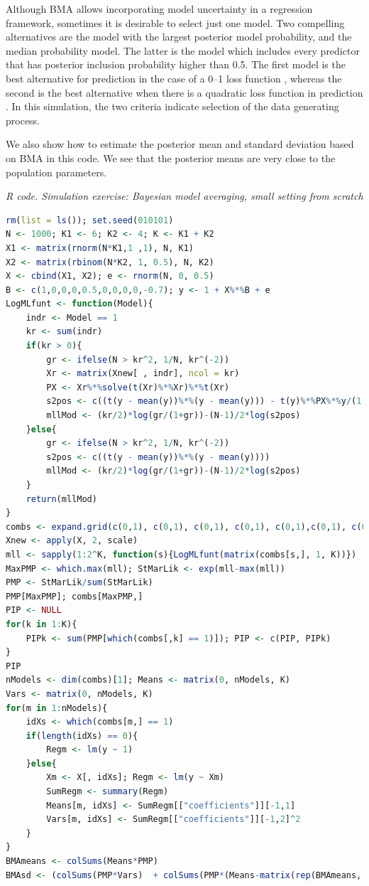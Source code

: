 Although BMA allows incorporating model uncertainty in a regression framework, sometimes it is desirable to select just one model. Two compelling alternatives are the model with the largest posterior model probability, and the median probability model. The latter is the model which includes every predictor that has posterior inclusion probability higher than 0.5. The first model is the best alternative for prediction in the case of a 0--1 loss function \cite{Clyde2004}, whereas the second is the best alternative when there is a quadratic loss function in prediction \cite{Barbieri2004}. In this simulation, the two criteria indicate selection of the data generating process.

We also show how to estimate the posterior mean and standard deviation based on BMA in this code. We see that the posterior means are very close to the population parameters.  

\begin{tcolorbox}[enhanced,width=4.67in,center upper,
	fontupper=\large\bfseries,drop shadow southwest,sharp corners]
	\textit{R code. Simulation exercise: Bayesian model averaging, small setting from scratch}
	\begin{VF}
		\begin{lstlisting}[language=R]
rm(list = ls()); set.seed(010101)
N <- 1000; K1 <- 6; K2 <- 4; K <- K1 + K2
X1 <- matrix(rnorm(N*K1,1 ,1), N, K1)
X2 <- matrix(rbinom(N*K2, 1, 0.5), N, K2)
X <- cbind(X1, X2); e <- rnorm(N, 0, 0.5)
B <- c(1,0,0,0,0.5,0,0,0,0,-0.7); y <- 1 + X%*%B + e			
LogMLfunt <- function(Model){
	indr <- Model == 1
	kr <- sum(indr)
	if(kr > 0){
		gr <- ifelse(N > kr^2, 1/N, kr^(-2))
		Xr <- matrix(Xnew[ , indr], ncol = kr)
		PX <- Xr%*%solve(t(Xr)%*%Xr)%*%t(Xr)
		s2pos <- c((t(y - mean(y))%*%(y - mean(y))) - t(y)%*%PX%*%y/(1 + gr))
		mllMod <- (kr/2)*log(gr/(1+gr))-(N-1)/2*log(s2pos)
	}else{
		gr <- ifelse(N > kr^2, 1/N, kr^(-2))
		s2pos <- c((t(y - mean(y))%*%(y - mean(y))))
		mllMod <- (kr/2)*log(gr/(1+gr))-(N-1)/2*log(s2pos)
	}
	return(mllMod)
}
combs <- expand.grid(c(0,1), c(0,1), c(0,1), c(0,1), c(0,1),c(0,1), c(0,1), c(0,1), c(0,1), c(0,1))
Xnew <- apply(X, 2, scale)
mll <- sapply(1:2^K, function(s){LogMLfunt(matrix(combs[s,], 1, K))})
MaxPMP <- which.max(mll); StMarLik <- exp(mll-max(mll))
PMP <- StMarLik/sum(StMarLik)
PMP[MaxPMP]; combs[MaxPMP,]
PIP <- NULL
for(k in 1:K){
	PIPk <- sum(PMP[which(combs[,k] == 1)]); PIP <- c(PIP, PIPk)
}
PIP
nModels <- dim(combs)[1]; Means <- matrix(0, nModels, K)
Vars <- matrix(0, nModels, K)
for(m in 1:nModels){
	idXs <- which(combs[m,] == 1)
	if(length(idXs) == 0){
		Regm <- lm(y ~ 1)
	}else{
		Xm <- X[, idXs]; Regm <- lm(y ~ Xm)
		SumRegm <- summary(Regm)
		Means[m, idXs] <- SumRegm[["coefficients"]][-1,1]
		Vars[m, idXs] <- SumRegm[["coefficients"]][-1,2]^2 
	}
}
BMAmeans <- colSums(Means*PMP)
BMAsd <- (colSums(PMP*Vars)  + colSums(PMP*(Means-matrix(rep(BMAmeans, each = nModels), nModels, K))^2))^0.5
\end{lstlisting}
	\end{VF}
\end{tcolorbox} 

